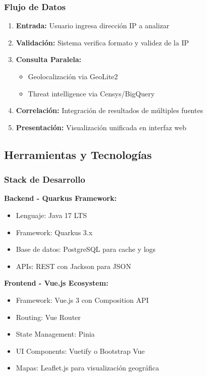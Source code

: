 \subsubsection{Flujo de Datos}

\begin{enumerate}
    \item \textbf{Entrada:} Usuario ingresa dirección IP a analizar
    \item \textbf{Validación:} Sistema verifica formato y validez de la IP
    \item \textbf{Consulta Paralela:}
    \begin{itemize}
        \item Geolocalización via GeoLite2
        \item Threat intelligence via Censys/BigQuery
    \end{itemize}
    \item \textbf{Correlación:} Integración de resultados de múltiples fuentes
    \item \textbf{Presentación:} Visualización unificada en interfaz web
\end{enumerate}

\subsection{Herramientas y Tecnologías}

\subsubsection{Stack de Desarrollo}

\textbf{Backend - Quarkus Framework:}
\begin{itemize}
    \item Lenguaje: Java 17 LTS
    \item Framework: Quarkus 3.x
    \item Base de datos: PostgreSQL para cache y logs
    \item APIs: REST con Jackson para JSON
\end{itemize}

\textbf{Frontend - Vue.js Ecosystem:}
\begin{itemize}
    \item Framework: Vue.js 3 con Composition API
    \item Routing: Vue Router
    \item State Management: Pinia
    \item UI Components: Vuetify o Bootstrap Vue
    \item Mapas: Leaflet.js para visualización geográfica
\end{itemize}

